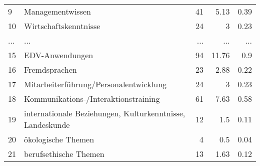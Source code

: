 \begin{longtable}{lXrrr}
        9 & \multicolumn{1}{X}{Managementwissen} & %
          \num{41} &
          \num[round-mode=places,round-precision=2]{5.13} &
          \num[round-mode=places,round-precision=2]{0.39} \\
        10 & \multicolumn{1}{X}{Wirtschaftskenntnisse} & %
          \num{24} &
          \num[round-mode=places,round-precision=2]{3} &
          \num[round-mode=places,round-precision=2]{0.23} \\
       ... & ... & ... & ... & ... \\
        15 & \multicolumn{1}{X}{EDV-Anwendungen} & %
          \num{94} &
          \num[round-mode=places,round-precision=2]{11.76} &
          \num[round-mode=places,round-precision=2]{0.9} \\

        16 & \multicolumn{1}{X}{Fremdsprachen} & %
          \num{23} &
          \num[round-mode=places,round-precision=2]{2.88} &
          \num[round-mode=places,round-precision=2]{0.22} \\

        17 & \multicolumn{1}{X}{Mitarbeiterführung/Personalentwicklung} & %
          \num{24} &
          \num[round-mode=places,round-precision=2]{3} &
          \num[round-mode=places,round-precision=2]{0.23} \\

        18 & \multicolumn{1}{X}{Kommunikations-/Interaktionstraining} & %
          \num{61} &
          \num[round-mode=places,round-precision=2]{7.63} &
          \num[round-mode=places,round-precision=2]{0.58} \\

        19 & \multicolumn{1}{X}{internationale Beziehungen, Kulturkenntnisse, Landeskunde} & %
          \num{12} &
          \num[round-mode=places,round-precision=2]{1.5} &
          \num[round-mode=places,round-precision=2]{0.11} \\

        20 & \multicolumn{1}{X}{ökologische Themen} & %
          \num{4} &
          \num[round-mode=places,round-precision=2]{0.5} &
          \num[round-mode=places,round-precision=2]{0.04} \\

        21 & \multicolumn{1}{X}{berufsethische Themen} & %
          \num{13} &
          \num[round-mode=places,round-precision=2]{1.63} &
          \num[round-mode=places,round-precision=2]{0.12} \\


\end{longtable}
